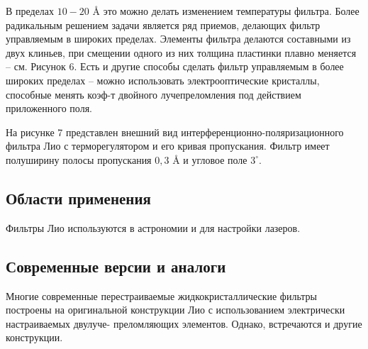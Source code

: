 В пределах $ 10 - 20 $ \AA \hspace{0.1cm} это можно делать изменением температуры фильтра. Более
радикальным решением задачи является ряд приемов, делающих фильтр управляемым в
широких пределах. Элементы фильтра делаются составными из двух клиньев, при смещении
одного из них толщина пластинки плавно меняется -- см. Рисунок 6. Есть и другие способы
сделать фильтр управляемым в более широких пределах -- можно использовать
электрооптические кристаллы, способные менять коэф-т двойного лучепреломления под
действием приложенного поля.


На рисунке 7 представлен внешний вид интерференционно-поляризационного фильтра Лио с
терморегулятором и его кривая пропускания. Фильтр имеет полуширину полосы пропускания
$ 0,3 $ \AA \hspace{0.1cm} и угловое поле $ 3^\circ $.


\subsection{Области применения}

Фильтры Лио используются в астрономии и для настройки лазеров.

\subsection{Современные версии и аналоги}

Многие современные перестраиваемые жидкокристаллические фильтры построены на \linebreak
оригинальной конструкции Лио с использованием электрически настраиваемых двулуче-\linebreak
преломляющих элементов. Однако, встречаются и другие конструкции.

